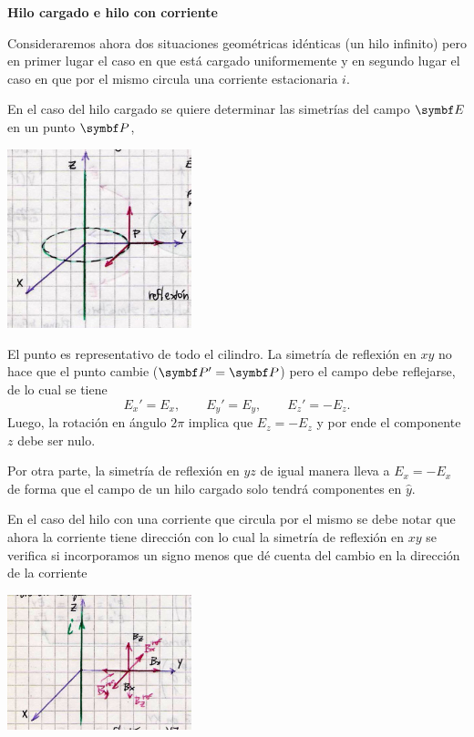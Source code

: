 \documentclass[10pt,oneside]{CBFT_book}
\begin{document}
\begin{ejemplo}{\bf Hilo cargado e hilo con corriente}

Consideraremos ahora dos situaciones geométricas idénticas (un hilo infinito) pero en primer lugar el
caso en que está cargado uniformemente y en segundo lugar el caso en que por el mismo circula una
corriente estacionaria $i$. 

En el caso del hilo cargado se quiere determinar las simetrías del campo $\vb{E}$ en un punto $\vb{P}$,

\includegraphics[width=0.4\textwidth]{images/fig_ft1_ej_hiloE.jpg}

El punto  es representativo de todo el cilindro. La simetría de reflexión en $xy$ no hace que el
punto cambie ($\vb{P}' = \vb{P}$) pero el campo debe reflejarse, de lo cual se tiene 
\[
	E_x' = E_x, \qquad E_y' = E_y, \qquad E_z' = -E_z.
\]
Luego, la rotación en ángulo $2\pi$ implica que $E_z = -E_z$ y por ende el componente $z$ debe ser nulo.

Por otra parte, la simetría de reflexión en $yz$ de igual manera lleva a $E_x = -E_x$ de forma que
el campo  de un hilo cargado solo tendrá componentes en $\hat{y}$.

En el caso del hilo con una corriente que circula por el mismo se debe notar que ahora la corriente tiene
dirección con lo cual la simetría de reflexión en $xy$ se verifica si incorporamos un signo menos que dé
cuenta del cambio en la dirección de la corriente

\includegraphics[width=0.4\textwidth]{images/fig_ft1_ej_hiloB.jpg}


\end{ejemplo}
\end{document}
